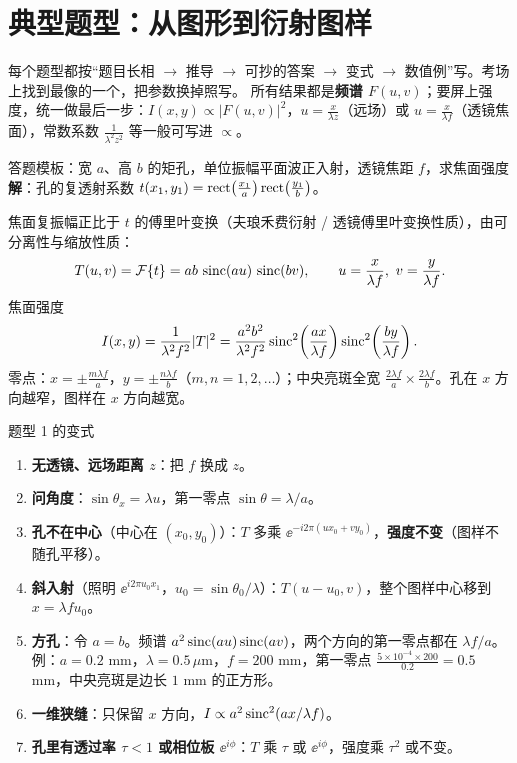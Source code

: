 \section{典型题型：从图形到衍射图样}\label{sec:ftexamples}

\begin{idea}[这一节怎么用]
每个题型都按“题目长相 $\to$ 推导 $\to$ 可抄的答案 $\to$ 变式 $\to$ 数值例”写。考场上找到最像的一个，把参数换掉照写。
所有结果都是\textbf{频谱 $F(u,v)$}；要屏上强度，统一做最后一步：$I(x,y)\propto|F(u,v)|^2$，$u=\frac{x}{\lambda z}$（远场）或 $u=\frac{x}{\lambda f}$（透镜焦面），常数系数 $\frac{1}{\lambda^2z^2}$ 等一般可写进 $\propto$。
\end{idea}


\begin{exam}{答题模板：宽 $a$、高 $b$ 的矩孔，单位振幅平面波正入射，透镜焦距 $f$，求焦面强度}
\textbf{解}：孔的复透射系数 $t(x_1,y_1)=\operatorname{rect}\!\left(\frac{x_1}{a}\right)\operatorname{rect}\!\left(\frac{y_1}{b}\right)$。

焦面复振幅正比于 $t$ 的傅里叶变换（夫琅禾费衍射 / 透镜傅里叶变换性质），由可分离性与缩放性质：
\[
T(u,v)=\mathcal{F}\{t\}=ab\,\operatorname{sinc}(au)\,\operatorname{sinc}(bv),\qquad u=\frac{x}{\lambda f},\ v=\frac{y}{\lambda f}.
\]
焦面强度
\[
I(x,y)=\frac{1}{\lambda^2f^2}|T|^2=\frac{a^2b^2}{\lambda^2f^2}\operatorname{sinc}^2\!\left(\frac{ax}{\lambda f}\right)\operatorname{sinc}^2\!\left(\frac{by}{\lambda f}\right).
\]
零点：$x=\pm\frac{m\lambda f}{a}$，$y=\pm\frac{n\lambda f}{b}$（$m,n=1,2,\dots$）；中央亮斑全宽 $\frac{2\lambda f}{a}\times\frac{2\lambda f}{b}$。孔在 $x$ 方向越窄，图样在 $x$ 方向越宽。
\end{exam}

\begin{recipe}{题型 1 的变式}
\begin{enumerate}
\item \textbf{无透镜、远场距离 $z$}：把 $f$ 换成 $z$。
\item \textbf{问角度}：$\sin\theta_x=\lambda u$，第一零点 $\sin\theta=\lambda/a$。
\item \textbf{孔不在中心}（中心在 $(x_0,y_0)$）：$T$ 多乘 $\ee^{-i2\pi(ux_0+vy_0)}$，\textbf{强度不变}（图样不随孔平移）。
\item \textbf{斜入射}（照明 $\ee^{i2\pi u_0x_1}$，$u_0=\sin\theta_0/\lambda$）：$T(u-u_0,v)$，整个图样中心移到 $x=\lambda fu_0$。
\item \textbf{方孔}：令 $a=b$。频谱 $a^2\operatorname{sinc}(au)\operatorname{sinc}(av)$，两个方向的第一零点都在 $\lambda f/a$。例：$a=0.2$ mm，$\lambda=0.5\,\mu$m，$f=200$ mm，第一零点 $\frac{5\times10^{-4}\times200}{0.2}=0.5$ mm，中央亮斑是边长 $1$ mm 的正方形。
\item \textbf{一维狭缝}：只保留 $x$ 方向，$I\propto a^2\operatorname{sinc}^2(ax/\lambda f)$。
\item \textbf{孔里有透过率 $\tau<1$ 或相位板 $\ee^{i\phi}$}：$T$ 乘 $\tau$ 或 $\ee^{i\phi}$，强度乘 $\tau^2$ 或不变。
\end{enumerate}
\end{recipe}

